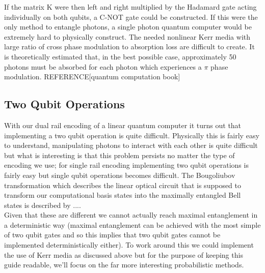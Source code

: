 If the matrix K were then left and right multiplied by the Hadamard gate acting individually on both qubits, a C-NOT gate could be constructed. If this were the only method to entangle photons, a single photon quantum computer would be extremely hard to physically construct. The needed nonlinear Kerr media with large ratio of cross phase modulation to absorption loss are difficult to create. It is theoretically estimated that, in the best possible case, approximately 50 photons must be absorbed for each photon which experiences a $\pi$ phase modulation.  REFERENCE[quantum computation book]







\subsection{Two Qubit Operations}
With our dual rail encoding of a linear quantum computer it turns out that implementing a two qubit operation is quite difficult. Physically this is fairly easy to understand, manipulating photons to interact with each other is quite difficult but what is interesting is that this problem persists no matter the type of encoding we use; for single rail encoding implementing two qubit operations is fairly easy but single qubit operations becomes difficult. The Bougoliubov transformation which describes the linear optical circuit that is supposed to transform our computational basis states into the maximally entangled Bell states is described by .... \\ Given that these are different we cannot actually reach maximal entanglement in a deterministic way (maximal entanglement can be achieved with the most simple of two qubit gates and so this implies that two qubit gates cannot be implemented deterministically either). To work around this we could implement the use of Kerr media as discussed above but for the purpose of keeping this guide readable, we'll focus on the far more interesting probabilistic methods.


